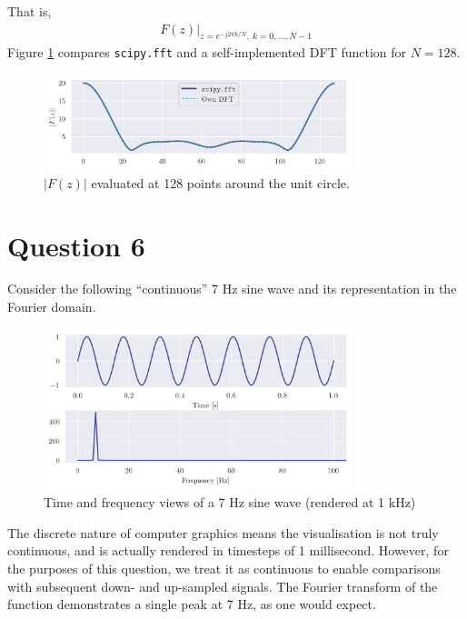 \documentclass[a4paper, 11pt]{article}
\begin{document}
\begin{enumerate}[label=\alph*)]
    That is,
    \begin{align*}
        F(z) \big|_{z=e^{-j2\pi k/N},\ k=0,\ldots,N-1}
    \end{align*}
    Figure \ref{fig:q5b_dftsample} compares \texttt{scipy.fft} and a
    self-implemented DFT function for $N=128$.
    \begin{figure}[ht]
        \centering
        \includegraphics[width=0.8\textwidth]{images/q5b_dftsample.png}
        \caption{$|F(z)|$ evaluated at 128 points around the unit circle.}
        \label{fig:q5b_dftsample}
    \end{figure}

\end{enumerate}

\newpage
\section*{Question 6}

Consider the following ``continuous'' 7 Hz sine wave and its representation in
the Fourier domain.
\begin{figure}[ht]
    \centering
    \includegraphics[width=0.8\textwidth]{images/q6_sine7hz.png}
    \caption{Time and frequency views of a 7 Hz sine wave (rendered at
        1 kHz)}
    \label{fig:q6_sine7hz}
\end{figure}

The discrete nature of computer graphics means the visualisation is not truly
continuous, and is actually rendered in timesteps of 1 millisecond. However, for
the purposes of this question, we treat it as continuous to enable comparisons
with subsequent down- and up-sampled signals. The Fourier transform of the
function demonstrates a single peak at 7 Hz, as one would expect.
\end{document}
